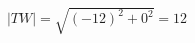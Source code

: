 \documentclass[preview]{standalone}
\begin{document}
\begin{align*}
|TW| = \sqrt{(-12)^2 + 0^2} = 12
\end{align*}
\end{document}
